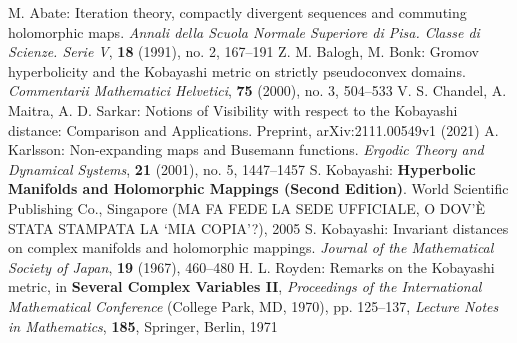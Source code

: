 \begin{thebibliography}{widest entry}
   M. Abate: Iteration theory, compactly divergent sequences and commuting holomorphic maps. \textit{Annali della Scuola Normale Superiore di Pisa. Classe di Scienze. Serie V}, \textbf{18} (1991), no. 2, 167--191
   Z. M. Balogh, M. Bonk: Gromov hyperbolicity and the Kobayashi metric on strictly pseudoconvex domains. \textit{Commentarii Mathematici Helvetici}, \textbf{75} (2000), no. 3, 504--533
   V. S. Chandel, A. Maitra, A. D. Sarkar: Notions of Visibility with respect to the Kobayashi distance: Comparison and Applications. Preprint, arXiv:2111.00549v1 (2021)
   A. Karlsson: Non-expanding maps and Busemann functions. \textit{Ergodic Theory and Dynamical Systems}, \textbf{21} (2001), no. 5, 1447--1457
   S. Kobayashi: \textbf{Hyperbolic Manifolds and Holomorphic Mappings (Second Edition)}. World Scientific Publishing Co., Singapore (MA FA FEDE LA SEDE UFFICIALE, O DOV'È STATA STAMPATA LA `MIA COPIA'?), 2005
   S. Kobayashi: Invariant distances on complex manifolds and holomorphic mappings. \textit{Journal of the Mathematical Society of Japan}, \textbf{19} (1967), 460--480
   H. L. Royden: Remarks on the Kobayashi metric, in \textbf{Several Complex Variables II}, \textit{Proceedings of the International Mathematical Conference} (College Park, MD, 1970), pp. 125--137, \textit{Lecture Notes in Mathematics}, \textbf{185}, Springer, Berlin, 1971
\end{thebibliography}
